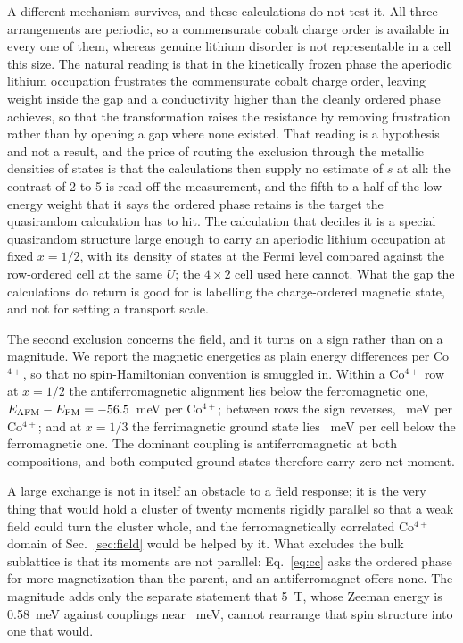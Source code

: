 \documentclass[reprint,twocolumn,prb,amsmath,amssymb,superscriptaddress,floatfix]{revtex4-2}
\begin{document}
A different mechanism survives, and these calculations do not test it. All three arrangements
are periodic, so a commensurate cobalt charge order is available in every one of them, whereas
genuine lithium disorder is not representable in a cell this size. The natural reading is that
in the kinetically frozen phase the aperiodic lithium occupation frustrates the commensurate
cobalt charge order, leaving weight inside the gap and a conductivity higher than the cleanly
ordered phase achieves, so that the transformation raises the resistance by removing frustration
rather than by opening a gap where none existed. That reading is a hypothesis and not a
result, and the price of routing the exclusion through the metallic densities of states is that
the calculations then supply no estimate of $s$ at all: the contrast of 2 to 5 is read off the
measurement, and the fifth to a half of the low-energy weight that it says the ordered phase
retains is the target the quasirandom calculation has to hit. The calculation that decides it is
a special quasirandom structure large enough to carry an aperiodic lithium occupation at fixed
$x=1/2$, with its density of states at the Fermi level compared against the row-ordered cell at
the same $U$; the $4\times2$ cell used here cannot. What the gap the calculations do return is
good for is labelling the charge-ordered magnetic state, and not for setting a transport scale.

The second exclusion concerns the field, and it turns on a sign rather than on a magnitude. We
report the magnetic energetics as plain energy differences per Co$^{4+}$, so that no
spin-Hamiltonian convention is smuggled in. Within a Co$^{4+}$ row at $x=1/2$ the
antiferromagnetic alignment lies below the ferromagnetic one,
$E_{\mathrm{AFM}}-E_{\mathrm{FM}}=-56.5$~meV per Co$^{4+}$; between rows the sign reverses,
\eafmInter~meV per Co$^{4+}$; and at $x=1/3$ the ferrimagnetic ground state lies \splitXthird~meV
per cell below the ferromagnetic one. The dominant coupling is antiferromagnetic at both
compositions, and both computed ground states therefore carry zero net moment.

A large exchange is not in itself an obstacle to a field response; it is the very thing that
would hold a cluster of twenty moments rigidly parallel so that a weak field could turn the
cluster whole, and the ferromagnetically correlated Co$^{4+}$ domain of Sec.~\ref{sec:field}
would be helped by it. What excludes the bulk sublattice is that its moments are not parallel:
Eq.~\eqref{eq:cc} asks the ordered phase for more magnetization than the parent, and an
antiferromagnet offers none. The magnitude adds only the separate statement that 5~T, whose
Zeeman energy is 0.58~meV against couplings near \jintraMag~meV, cannot rearrange that spin
structure into one that would.
\end{document}
